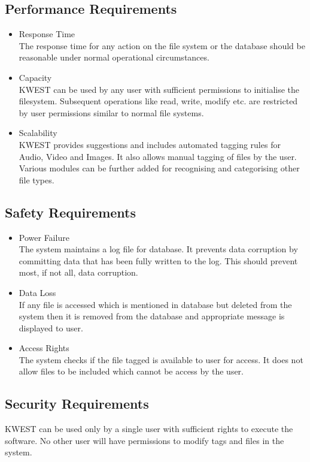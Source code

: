 \subsection {Performance Requirements}
\begin {itemize}
\item Response Time \\
The response time for any action on the file system or the database should be reasonable under normal operational circumstances. 
\item Capacity \\
KWEST can be used by any user with sufficient permissions to initialise the filesystem. Subsequent operations like read, write, modify etc. are restricted by user permissions similar to normal file systems.
\item Scalability \\
KWEST provides suggestions and includes automated tagging rules for Audio, Video and Images. It also allows manual tagging of files by the user. Various modules can be further added for recognising and categorising other file types.
\end{itemize}

\subsection {Safety Requirements}
\begin{itemize}
\item Power Failure \\
The system maintains a log file for database. It prevents data corruption by committing data that has been fully written to the log. This should prevent most, if not all, data corruption.
\item Data Loss \\
If any file is accessed which is mentioned in database but deleted from the system then it is removed from the database and appropriate message is displayed to user.
\item Access Rights \\
The system checks if the file tagged is available to user for access. It does not allow files to be included which cannot be access by the user.
\end{itemize}

\subsection {Security Requirements}
KWEST can be used only by a single user with sufficient rights to execute the software. No other user will have permissions to modify tags and files in the system.

